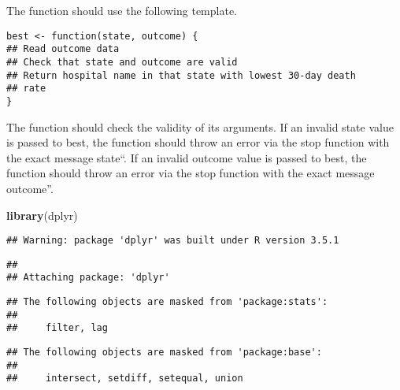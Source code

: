 \documentclass[]{article}
\newenvironment{Shaded}{\begin{snugshade}}{\end{snugshade}}
\newcommand{\KeywordTok}[1]{\textcolor[rgb]{0.13,0.29,0.53}{\textbf{#1}}}
\newcommand{\NormalTok}[1]{#1}
\begin{document}
The function should use the following template.

\begin{verbatim}
best <- function(state, outcome) {
## Read outcome data
## Check that state and outcome are valid
## Return hospital name in that state with lowest 30-day death
## rate
}
\end{verbatim}

The function should check the validity of its arguments. If an invalid
state value is passed to best, the function should throw an error via
the stop function with the exact message \invalid state``. If an invalid
outcome value is passed to best, the function should throw an error via
the stop function with the exact message \invalid outcome''.

\begin{Shaded}
\begin{Highlighting}[]
\KeywordTok{library}\NormalTok{(dplyr)}
\end{Highlighting}
\end{Shaded}

\begin{verbatim}
## Warning: package 'dplyr' was built under R version 3.5.1
\end{verbatim}

\begin{verbatim}
## 
## Attaching package: 'dplyr'
\end{verbatim}

\begin{verbatim}
## The following objects are masked from 'package:stats':
## 
##     filter, lag
\end{verbatim}

\begin{verbatim}
## The following objects are masked from 'package:base':
## 
##     intersect, setdiff, setequal, union
\end{verbatim}
\end{document}
